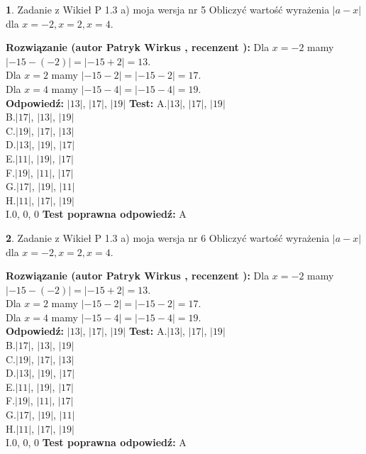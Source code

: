 \documentclass[12pt, a4paper]{article}
\theoremstyle{definition} %
\newtheorem{zad}{}
\newcommand{\zadStart}[1]{\begin{zad}#1\newline}
\newcommand{\zadStop}{\end{zad}}
\newcommand{\rozwStart}[2]{\noindent \textbf{Rozwiązanie (autor #1 , recenzent #2): }\newline}
\newcommand{\rozwStop}{\newline}
\newcommand{\odpStart}{\noindent \textbf{Odpowiedź:}\newline}
\newcommand{\odpStop}{\newline}
\newcommand{\testStart}{\noindent \textbf{Test:}\newline}
\newcommand{\testStop}{\newline}
\newcommand{\kluczStart}{\noindent \textbf{Test poprawna odpowiedź:}\newline}
\newcommand{\kluczStop}{\newline}
\begin{document}
\zadStart{Zadanie z Wikieł P 1.3 a) moja wersja nr 5}
Obliczyć wartość wyrażenia $|a - x|$ dla $x=-2,x=2,x=4$.
\zadStop
\rozwStart{Patryk Wirkus}{}
Dla $x = -2$ mamy $|-15 - (-2)| = |-15 + 2| = 13$.\\
Dla $x = 2$ mamy $|-15 - 2| = |-15 - 2| = 17$.\\
Dla $x = 4$ mamy $|-15 - 4| = |-15 - 4| = 19$.\\
\rozwStop
\odpStart
$|13|$, $|17|$, $|19|$
\odpStop
\testStart
A.$|13|$, $|17|$, $|19|$\\
B.$|17|$, $|13|$, $|19|$\\
C.$|19|$, $|17|$, $|13|$\\
D.$|13|$, $|19|$, $|17|$\\
E.$|11|$, $|19|$, $|17|$\\
F.$|19|$, $|11|$, $|17|$\\
G.$|17|$, $|19|$, $|11|$\\
H.$|11|$, $|17|$, $|19|$\\
I.$0$, $0$, $0$
\testStop
\kluczStart
A
\kluczStop



\zadStart{Zadanie z Wikieł P 1.3 a) moja wersja nr 6}
Obliczyć wartość wyrażenia $|a - x|$ dla $x=-2,x=2,x=4$.
\zadStop
\rozwStart{Patryk Wirkus}{}
Dla $x = -2$ mamy $|-15 - (-2)| = |-15 + 2| = 13$.\\
Dla $x = 2$ mamy $|-15 - 2| = |-15 - 2| = 17$.\\
Dla $x = 4$ mamy $|-15 - 4| = |-15 - 4| = 19$.\\
\rozwStop
\odpStart
$|13|$, $|17|$, $|19|$
\odpStop
\testStart
A.$|13|$, $|17|$, $|19|$\\
B.$|17|$, $|13|$, $|19|$\\
C.$|19|$, $|17|$, $|13|$\\
D.$|13|$, $|19|$, $|17|$\\
E.$|11|$, $|19|$, $|17|$\\
F.$|19|$, $|11|$, $|17|$\\
G.$|17|$, $|19|$, $|11|$\\
H.$|11|$, $|17|$, $|19|$\\
I.$0$, $0$, $0$
\testStop
\kluczStart
A
\kluczStop
\end{document}
